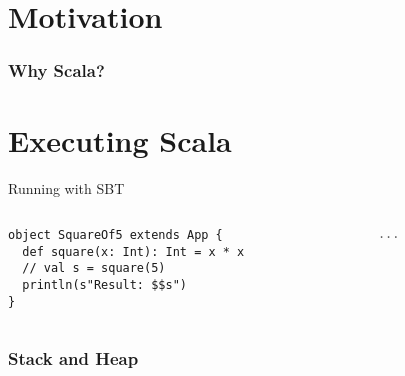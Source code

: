 \documentclass[aspectratio=169]{beamer}
\begin{document}
\frame[plain]{\titlepage}


\section{Motivation}

\begin{frame}\frametitle{Why Scala?}
    

\end{frame}

\section{Executing Scala}

\begin{frame}[fragile]{Running with SBT}
~\\[-8mm]
\begin{columns}
\begin{column}{0.48\textwidth}
\begin{lstlisting}
object SquareOf5 extends App {
  def square(x: Int): Int = x * x
  // val s = square(5)
  println(s"Result: $$s")
}
\end{lstlisting}
\end{column}
\begin{column}{0.48\textwidth}
\begin{lstlisting}[language=scala]
...
\end{lstlisting}
\end{column}
\end{columns}
\end{frame}


\begin{frame}\frametitle{Stack and Heap}
    \centering
    

\end{frame}
\end{document}
